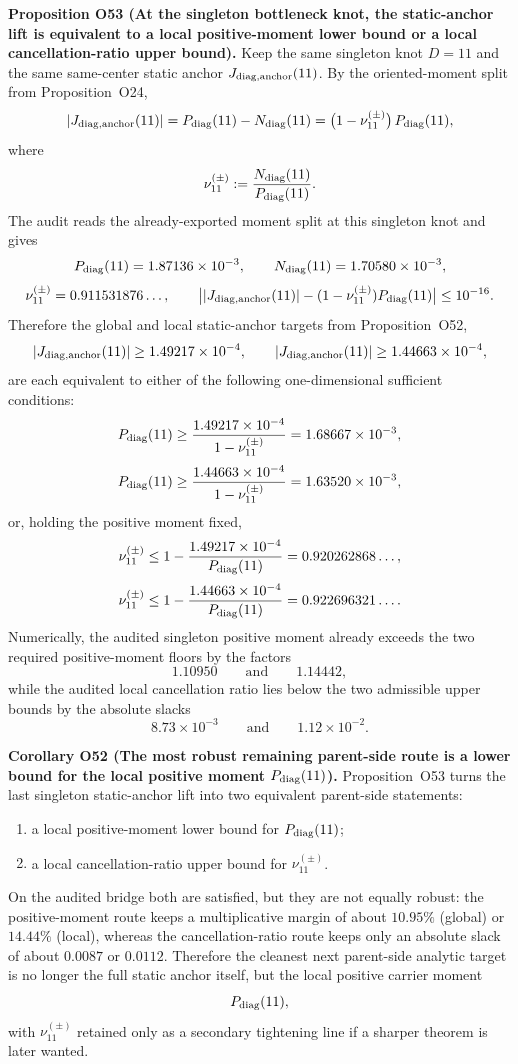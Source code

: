 \documentclass[aps,prd,onecolumn,notitlepage,nofootinbib,superscriptaddress,11pt,floatfix]{revtex4-2}
\begin{document}
\medskip\noindent\textbf{Proposition O53 (At the singleton bottleneck knot, the static-anchor lift is equivalent to a local positive-moment lower bound or a local cancellation-ratio upper bound).}
Keep the same singleton knot \(D=11\) and the same same-center static anchor \(J_{{\rm diag},\rm anchor}(11)\).  By the oriented-moment split from Proposition~O24,
\[
|J_{{\rm diag},\rm anchor}(11)|
=
P_{\rm diag}(11)-N_{\rm diag}(11)
=
\bigl(1-\nu_{11}^{(\pm)}\bigr)\,P_{\rm diag}(11),
\]
where
\[
\nu_{11}^{(\pm)}
:=
\frac{N_{\rm diag}(11)}{P_{\rm diag}(11)}.
\]
The audit
reads the already-exported moment split at this singleton knot and gives
\[
P_{\rm diag}(11)=1.87136\times10^{-3},
\qquad
N_{\rm diag}(11)=1.70580\times10^{-3},
\]
\[
\nu_{11}^{(\pm)}=0.911531876\ldots,
\qquad
\bigl||J_{{\rm diag},\rm anchor}(11)|-(1-\nu_{11}^{(\pm)})P_{\rm diag}(11)\bigr|
\le 10^{-16}.
\]
Therefore the global and local static-anchor targets from Proposition~O52,
\[
|J_{{\rm diag},\rm anchor}(11)|\ge 1.49217\times10^{-4},
\qquad
|J_{{\rm diag},\rm anchor}(11)|\ge 1.44663\times10^{-4},
\]
are each equivalent to either of the following one-dimensional sufficient conditions:
\[
P_{\rm diag}(11)\ge \frac{1.49217\times10^{-4}}{1-\nu_{11}^{(\pm)}}
=
1.68667\times10^{-3},
\]
\[
P_{\rm diag}(11)\ge \frac{1.44663\times10^{-4}}{1-\nu_{11}^{(\pm)}}
=
1.63520\times10^{-3},
\]
or, holding the positive moment fixed,
\[
\nu_{11}^{(\pm)}\le 1-\frac{1.49217\times10^{-4}}{P_{\rm diag}(11)}
=
0.920262868\ldots,
\]
\[
\nu_{11}^{(\pm)}\le 1-\frac{1.44663\times10^{-4}}{P_{\rm diag}(11)}
=
0.922696321\ldots.
\]
Numerically, the audited singleton positive moment already exceeds the two required positive-moment floors by the factors
\[
1.10950
\qquad\text{and}\qquad
1.14442,
\]
while the audited local cancellation ratio lies below the two admissible upper bounds by the absolute slacks
\[
8.73\times10^{-3}
\qquad\text{and}\qquad
1.12\times10^{-2}.
\]

\medskip\noindent\textbf{Corollary O52 (The most robust remaining parent-side route is a lower bound for the local positive moment \(P_{\rm diag}(11)\)).}
Proposition~O53 turns the last singleton static-anchor lift into two equivalent parent-side statements:
\begin{enumerate}
\item a local positive-moment lower bound for \(P_{\rm diag}(11)\);
\item a local cancellation-ratio upper bound for \(\nu_{11}^{(\pm)}\).
\end{enumerate}
On the audited bridge both are satisfied, but they are not equally robust: the positive-moment route keeps a multiplicative margin of about \(10.95\%\) (global) or \(14.44\%\) (local), whereas the cancellation-ratio route keeps only an absolute slack of about \(0.0087\) or \(0.0112\).  Therefore the cleanest next parent-side analytic target is no longer the full static anchor itself, but the local positive carrier moment
\[
P_{\rm diag}(11),
\]
with \(\nu_{11}^{(\pm)}\) retained only as a secondary tightening line if a sharper theorem is later wanted.
\end{document}
